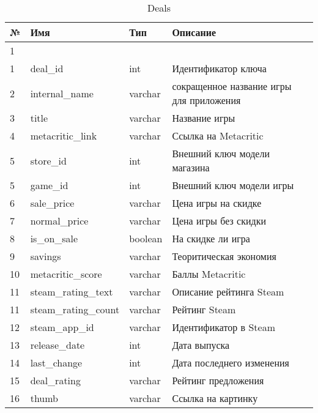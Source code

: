 \begin{table}[!ht]
\caption{Deals}
\label{table:func:deals}
 \centering
 \begin{tabular}
 {| >{\raggedright}m{}
 | >{\centering}m{}
 | >{\centering}m{}
 | >{\centering\arraybackslash}m{}|}
   \hline
   № & Имя & Тип & Описание \\
   \hline
   1 & 2 & 3 & 4 \\
 
   \hline
   1 & deal\_id & int & Идентификатор ключа \\
   \hline
   2 & internal\_name & varchar & сокращенное название игры для приложения \\
   \hline
   3 & title & varchar & Название игры \\
   \hline
   4 & metacritic\_link & varchar & Ссылка на Metacritic \\
   \hline
   5 & store\_id & int & Внешний ключ модели магазина \\
   \hline
   5 & game\_id & int & Внешний ключ модели игры\\
   \hline
   6 & sale\_price & varchar & Цена игры на скидке\\
   \hline
   7 & normal\_price & varchar & Цена игры без скидки\\
   \hline
   8 & is\_on\_sale & boolean & На скидке ли игра\\
   \hline
   9 & savings & varchar & Теоритическая экономия\\
   \hline
   10 & metacritic\_score & varchar & Баллы Metacritic\\
   \hline
   11 & steam\_rating\_text & varchar & Описание рейтинга Steam\\
   \hline
   11 & steam\_rating\_count & varchar & Рейтинг Steam\\
   \hline
   12 & steam\_app\_id & varchar & Идентификатор в Steam\\
   \hline
   13 & release\_date & int & Дата выпуска\\
   \hline
   14 & last\_change & int & Дата последнего изменения\\
   \hline
   15 & deal\_rating & varchar & Рейтинг предложения\\
   \hline
   16 & thumb & varchar & Ссылка на картинку\\
   \hline
 \end{tabular}
\end{table}

